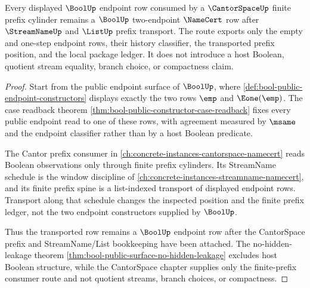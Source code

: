 \begin{theorem}
\label{thm:bool-cantor-space-endpoint-route}
Every displayed $\BoolUp$ endpoint row consumed by a $\CantorSpaceUp$ finite prefix cylinder remains a $\BoolUp$ two-endpoint $\NameCert$ row after $\StreamNameUp$ and $\ListUp$ prefix transport. The route exports only the empty and one-step endpoint rows, their history classifier, the transported prefix position, and the local package ledger. It does not introduce a host Boolean, quotient stream equality, branch choice, or compactness claim.
\end{theorem}
\begin{proof}
Start from the public endpoint surface of $\BoolUp$, where \autoref{def:bool-public-endpoint-constructors} displays exactly the two rows $\emp$ and $\Eone(\emp)$. The case readback theorem \autoref{thm:bool-public-constructor-case-readback} fixes every public endpoint read to one of these rows, with agreement measured by $\msame$ and the endpoint classifier rather than by a host Boolean predicate.

The Cantor prefix consumer in \autoref{ch:concrete-instances-cantorspace-namecert} reads Boolean observations only through finite prefix cylinders. Its StreamName schedule is the window discipline of \autoref{ch:concrete-instances-streamname-namecert}, and its finite prefix spine is a list-indexed transport of displayed endpoint rows. Transport along that schedule changes the inspected position and the finite prefix ledger, not the two endpoint constructors supplied by $\BoolUp$.

Thus the transported row remains a $\BoolUp$ endpoint row after the CantorSpace prefix and StreamName/List bookkeeping have been attached. The no-hidden-leakage theorem \autoref{thm:bool-public-surface-no-hidden-leakage} excludes host Boolean structure, while the CantorSpace chapter supplies only the finite-prefix consumer route and not quotient streams, branch choices, or compactness.
\end{proof}
